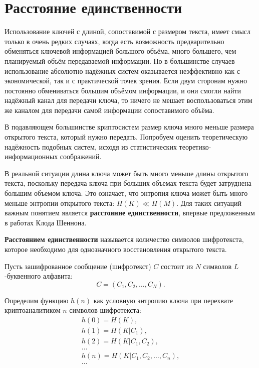 \section{Расстояние единственности}\label{section_unicity_distance}

Использование ключей с длиной, сопоставимой с размером текста, имеет смысл только в очень редких случаях, когда есть возможность предварительно обменяться ключевой информацией большого объёма, много большего, чем планируемый объём передаваемой информации. Но в большинстве случаев использование абсолютно надёжных систем оказывается неэффективно как с экономической, так и с практической точек зрения. Если двум сторонам нужно постоянно обмениваться большим объёмом информации, и они смогли найти надёжный канал для передачи ключа, то ничего не мешает воспользоваться этим же каналом для передачи самой информации сопоставимого объёма.

В подавляющем большинстве криптосистем размер ключа много меньше размера открытого текста, который нужно передать. Попробуем оценить теоретическую надёжность подобных систем, исходя из статистических теоретико-информационных соображений.

В реальной ситуации длина ключа может быть много меньше длины открытого текста, поскольку передача ключа при больших объемах текста будет затруднена большим объемом ключа. Это означает, что энтропия ключа может быть  много меньше энтропии открытого текста: $H(K) \ll H(M)$. Для таких ситуаций важным понятием является \textbf{расстояние единственности}, впервые предложенным в работах Клода Шеннона.~\cite{Golomb:2002, Schneier:2011}

\begin{definition}\label{definition:unicity_distance}
\textbf{Расстоянием единственности} называется количество символов шифротекста, которое необходимо для однозначного восстановления открытого текста.
\end{definition}

Пусть зашифрованное сообщение (шифротекст) $C$ состоит из $N$ символов $L$-буквенного алфавита:
	\[C = (C_1, C_2, \dots, C_N).\]

Определим функцию $h(n)$ как условную энтропию ключа при перехвате криптоаналитиком $n$ символов шифротекста:
\[ \begin{array}{l}
    h ( 0 ) = H(K), \\
    h ( 1 ) = H(K | C_1), \\
    h ( 2 ) = H(K | C_1, C_2), \\
    \dots \\
    h ( n ) = H(K | C_1, C_2, \dots, C_n), \\
    \dots
\end{array} \]


